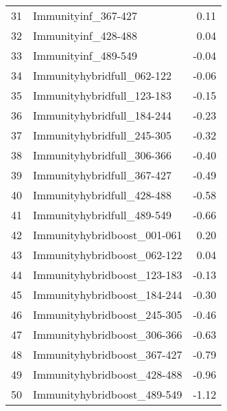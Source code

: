 \begin{table}[ht]
\begin{tabular}{rlr}
  31 & Immunityinf\_367-427 & 0.11 \\ 
  32 & Immunityinf\_428-488 & 0.04 \\ 
  33 & Immunityinf\_489-549 & -0.04 \\ 
  34 & Immunityhybridfull\_062-122 & -0.06 \\ 
  35 & Immunityhybridfull\_123-183 & -0.15 \\ 
  36 & Immunityhybridfull\_184-244 & -0.23 \\ 
  37 & Immunityhybridfull\_245-305 & -0.32 \\ 
  38 & Immunityhybridfull\_306-366 & -0.40 \\ 
  39 & Immunityhybridfull\_367-427 & -0.49 \\ 
  40 & Immunityhybridfull\_428-488 & -0.58 \\ 
  41 & Immunityhybridfull\_489-549 & -0.66 \\ 
  42 & Immunityhybridboost\_001-061 & 0.20 \\ 
  43 & Immunityhybridboost\_062-122 & 0.04 \\ 
  44 & Immunityhybridboost\_123-183 & -0.13 \\ 
  45 & Immunityhybridboost\_184-244 & -0.30 \\ 
  46 & Immunityhybridboost\_245-305 & -0.46 \\ 
  47 & Immunityhybridboost\_306-366 & -0.63 \\ 
  48 & Immunityhybridboost\_367-427 & -0.79 \\ 
  49 & Immunityhybridboost\_428-488 & -0.96 \\ 
  50 & Immunityhybridboost\_489-549 & -1.12 \\ 
   \hline
\end{tabular}
\end{table}
